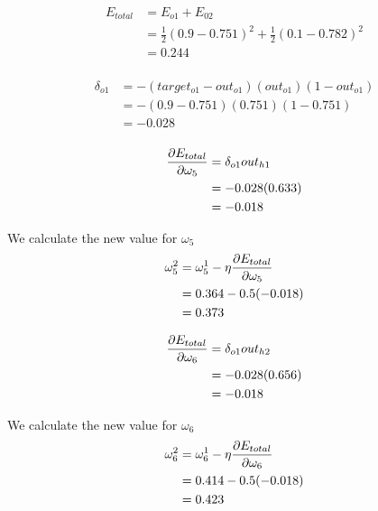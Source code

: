 \documentclass[10pt,a4paper]{article}
\begin{document}
\begin{equation}
\begin{split}
E_{total} &= E_{o1} + E_{02} \\
          &= \frac{1}{2}(0.9-0.751)^2 + \frac{1}{2}(0.1 - 0.782)^2 \\
          &= 0.244 \\
\end{split}
\end{equation}

\begin{equation}
\begin{split}
\delta_{o1} &= -(target_{o1} -out_{o1})(out_{o1})(1-out_{o1})\\
            &= -(0.9-0.751)(0.751)(1-0.751)\\
            &= -0.028\\
\end{split}
\end{equation}

\begin{equation}
\begin{split}
\pdv{E_{total}}{\omega_5} &= \delta_{o1}out_{h1}\\
                          &= -0.028(0.633)\\
                          &= -0.018\\
\end{split}
\end{equation}

We calculate the new value for $\omega_5$
\begin{equation}
\begin{split}
\omega_5^2 &= \omega_5^1 - \eta\pdv{E_{total}}{\omega_5}\\
           &= 0.364 -0.5(-0.018)\\
           &= 0.373\\
\end{split}
\end{equation}

\begin{equation}
\begin{split}
\pdv{E_{total}}{\omega_6} &= \delta_{o1}out_{h2}\\
                          &= -0.028(0.656)\\
                          &= -0.018\\
\end{split}
\end{equation}

We calculate the new value for $\omega_6$
\begin{equation}
\begin{split}
\omega_6^2 &= \omega_6^1 - \eta\pdv{E_{total}}{\omega_6}\\
           &= 0.414 -0.5(-0.018)\\
           &= 0.423\\
\end{split}
\end{equation}
\end{document}
